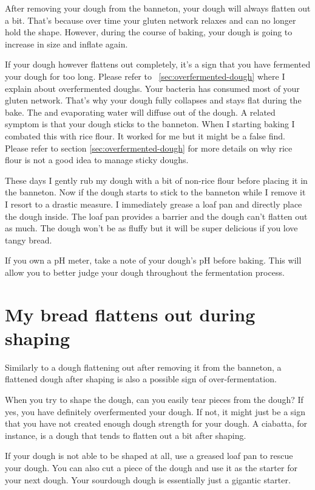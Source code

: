After removing your dough from the banneton, your dough will always
flatten out a bit. That's because over time your gluten network
relaxes and can no longer hold the shape. However, during the course
of baking, your dough is going to increase in size and inflate again.

If your dough however flattens out completely, it's a sign that
you have fermented your dough for too long. Please refer to ~\ref{sec:overfermented-dough}
where I explain about overfermented doughs. Your bacteria
has consumed most of your gluten network. That's why your
dough fully collapses and stays flat during the bake. The
 and evaporating water will diffuse out of the dough.
A related symptom is that your dough sticks to the banneton.
When I starting baking I combated this with rice flour.
It worked for me but it might be a false find. Please refer to
section \ref{sec:overfermented-dough} for more details on why
rice flour is not a good idea to manage sticky doughs.

These days I gently rub my
dough with a bit of non-rice flour before placing it in
the banneton. Now if the dough starts to stick to the banneton
while I remove it I resort to a drastic measure. I immediately
grease a loaf pan and directly place the dough inside. The loaf
pan provides a barrier and the dough can't flatten out as much.
The dough won't be as fluffy but it will be super delicious if you love tangy bread.

If you own a pH meter, take a note of your dough's pH before baking.
This will allow you to better judge your dough throughout
the fermentation process.

\section{My bread flattens out during shaping}

Similarly to a dough flattening out after removing it from the banneton,
a flattened dough after shaping is also a possible sign of over-fermentation.

When you try to shape the dough, can you easily tear pieces from the dough?
If yes, you have definitely overfermented your dough. If not, it might just
be a sign that you have not created enough dough strength for your dough.
A ciabatta, for instance, is a dough that tends to flatten out a bit after shaping.

If your dough is not able to be shaped at all, use a greased loaf pan
to rescue your dough. You can also cut a piece of the dough and use it
as the starter for your next dough. Your sourdough dough is essentially
just a gigantic starter.

